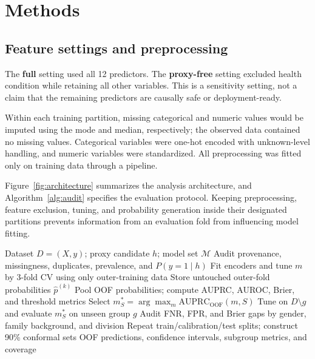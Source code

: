 \documentclass[conference]{IEEEtran}
\begin{document}
\section{Methods}
\subsection{Feature settings and preprocessing}
The \textbf{full} setting used all 12 predictors. The \textbf{proxy-free} setting excluded health condition while retaining all other variables. This is a sensitivity setting, not a claim that the remaining predictors are causally safe or deployment-ready.

Within each training partition, missing categorical and numeric values would be imputed using the mode and median, respectively; the observed data contained no missing values. Categorical variables were one-hot encoded with unknown-level handling, and numeric variables were standardized. All preprocessing was fitted only on training data through a pipeline.

Figure~\ref{fig:architecture} summarizes the analysis architecture, and Algorithm~\ref{alg:audit} specifies the evaluation protocol. Keeping preprocessing, feature exclusion, tuning, and probability generation inside their designated partitions prevents information from an evaluation fold from influencing model fitting.

\begin{algorithm}[t]
\caption{Outcome-proxy sensitivity and reliability audit}
\label{alg:audit}
\begin{algorithmic}[1]
\Require Dataset $D=(X,y)$; proxy candidate $h$; model set $\mathcal{M}$
\State Audit provenance, missingness, duplicates, prevalence, and $P(y=1\mid h)$
 
            \State Fit encoders and tune $m$ by 3-fold CV using only outer-training data
            \State Store untouched outer-fold probabilities $\hat{p}^{(k)}$
        \EndFor
        \State Pool OOF probabilities; compute AUPRC, AUROC, Brier, and threshold metrics
    \EndFor
    \State Select $m^*_S=\arg\max_m \mathrm{AUPRC}_{\mathrm{OOF}}(m,S)$
\EndFor
{}
    \State Tune on $D\setminus g$ and evaluate $m^*_S$ on unseen group $g$
\EndFor
\State Audit FNR, FPR, and Brier gaps by gender, family background, and division
\State Repeat train/calibration/test splits; construct 90\% conformal sets
\State \Return OOF predictions, confidence intervals, subgroup metrics, and coverage
\end{algorithmic}
\end{algorithm}
\end{document}
